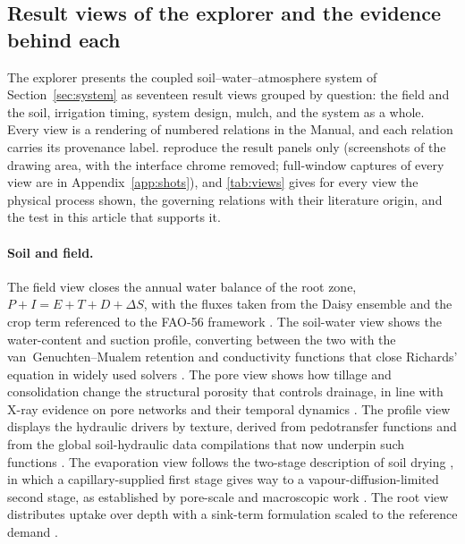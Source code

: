 \subsection{Result views of the explorer and the evidence behind each}
\label{sec:views}
The explorer presents the coupled soil--water--atmosphere system of Section~\ref{sec:system} as seventeen result views grouped by question: the field and the soil, irrigation timing, system design, mulch, and the system as a whole. Every view is a rendering of numbered relations in the Manual, and each relation carries its provenance label.  reproduce the result panels only (screenshots of the drawing area, with the interface chrome removed; full-window captures of every view are in Appendix~\ref{app:shots}), and \cref{tab:views} gives for every view the physical process shown, the governing relations with their literature origin, and the test in this article that supports it.

\paragraph{Soil and field.} The field view closes the annual water balance of the root zone, $P+I=E+T+D+\Delta S$, with the fluxes taken from the Daisy ensemble \citep{Hansen2012,Abrahamsen2000} and the crop term referenced to the FAO-56 framework \citep{Allen1998}. The soil-water view shows the water-content and suction profile, converting between the two with the van~Genuchten--Mualem retention and conductivity functions \citep{vanGenuchten1980,Mualem1976} that close Richards' equation \citep{Richards1931} in widely used solvers \citep{Simunek2008}. The pore view shows how tillage and consolidation change the structural porosity that controls drainage, in line with X-ray evidence on pore networks and their temporal dynamics \citep{Strudley2008,Blunt2017,Leuther2021}. The profile view displays the hydraulic drivers by texture, derived from pedotransfer functions \citep{Saxton2006,Schaap2001} and from the global soil-hydraulic data compilations that now underpin such functions \citep{Vereecken2016,Weber2024}. The evaporation view follows the two-stage description of soil drying \citep{Ritchie1972,Philip1957}, in which a capillary-supplied first stage gives way to a vapour-diffusion-limited second stage, as established by pore-scale and macroscopic work \citep{Lehmann2008,Or2013,Shokri2011}. The root view distributes uptake over depth with a sink-term formulation \citep{Feddes1978} scaled to the reference demand \citep{Allen1998}.

